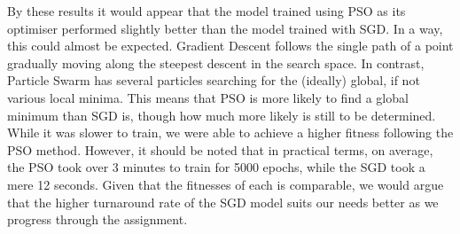 \documentclass[12pt]{article}
\begin{document}
By these results it would appear that the model trained using PSO as its optimiser performed slightly better than the model trained with SGD. 
In a way, this could almost be expected. Gradient Descent follows the single path of a point gradually moving along the steepest descent in the search space.
In contrast, Particle Swarm has several particles searching for the (ideally) global, if not various local minima. 
This means that PSO is more likely to find a global minimum than SGD is, though how much more likely is still to be determined.
While it was slower to train, we were able to achieve a higher fitness following the PSO method. However, it should be noted that in practical terms, on average, the PSO took over 3 minutes to train for 5000 epochs, while the SGD took a mere 12 seconds. Given that the fitnesses of each is comparable, we would argue that the higher turnaround rate of the SGD model suits our needs better as we progress through the assignment.
\end{document}
